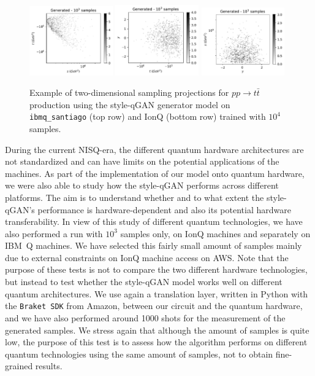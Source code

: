 \documentclass[twocolumn,preprintnumbers,superscriptaddress]{revtex4-2}
\begin{document}
\begin{figure}
  \includegraphics[width=0.32\textwidth]{plots/hardware/ionQ/s-t_FAKE_ionQ_1k.pdf}%
  \includegraphics[width=0.32\textwidth]{plots/hardware/ionQ/t-y_FAKE_ionQ_1k.pdf}%
  \includegraphics[width=0.32\textwidth]{plots/hardware/ionQ/y-s_FAKE_ionQ_1k.pdf}

  \caption{\label{fig:ionq}Example of two-dimensional sampling projections for
  $pp \rightarrow t\bar{t}$ production using the style-qGAN generator
  model on {\tt ibmq\_santiago} (top row) and IonQ (bottom row) trained with $10^4$ samples.}
\end{figure}

During the current NISQ-era, the different quantum hardware architectures are not standardized and can have limits
on the potential applications of the machines. As part of the implementation of our model onto quantum hardware, we were also able to study how the style-qGAN performs across different platforms.
The aim is to understand whether and to what extent the style-qGAN's performance is hardware-dependent and also its potential hardware transferability.
In view of this study of different quantum technologies, we have also performed a run
with $10^3$ samples only, on IonQ machines and separately on IBM~Q
machines. We have selected this fairly small amount of samples
mainly due to external constraints on IonQ machine access on AWS.
Note that the purpose of these tests is not to compare the two different hardware technologies,
but instead to test whether the style-qGAN model works well on different quantum architectures.
We use again a translation layer, written in Python with the
\texttt{Braket SDK} from Amazon, between our circuit and the quantum hardware, and we
have also performed around 1000 shots for the measurement of the generated samples.
We stress again that although the amount of samples is quite low, the purpose of this test is to assess
how the algorithm performs on different quantum technologies using the same amount of
samples, not to obtain fine-grained results.
\end{document}
